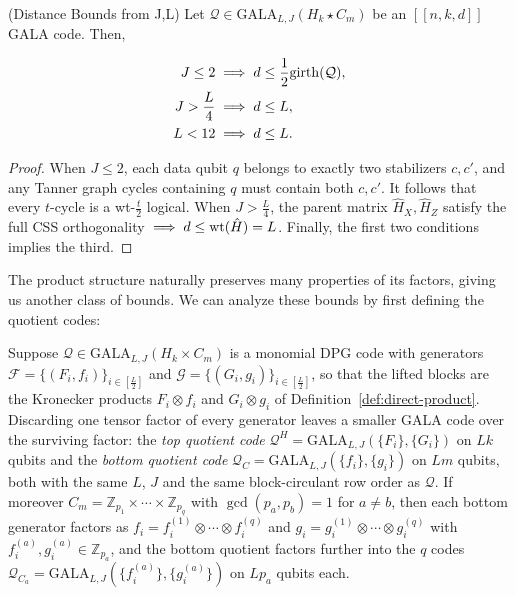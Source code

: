 \begin{proposition}(Distance Bounds from J,L)\label{prop:distance-bound}
Let $\mathcal{Q}\in \mathrm{GALA}_{L,J}(H_k\star C_m)$ be an $[[n,k,d]]$ GALA code. Then,

\begin{align}
     J\leq 2        &\implies d\leq \frac12\mathrm{girth}(\mathcal{Q})\label{eq:j<=2}, \\
     J>\frac{L}{4}  &\implies d\leq L,\label{eq:j>=L/4}\\
     L<12&\implies d\leq L.\label{eq:j<12}
\end{align}

\end{proposition}

\begin{proof}
    When $J\leq 2$, each data qubit $q$ belongs to exactly two stabilizers $c, c'$, and any Tanner graph cycles containing $q$ must contain both $c,c'$. It follows that every $t$-cycle is a wt-$\frac t2$ logical. When $J> \frac L4$, the parent matrix $\hat{H}_X, \hat{H}_Z$ satisfy the full CSS orthogonality $\implies d\leq \mathrm{wt}(\hat H) = L$. Finally, the first two conditions implies the third. 
\end{proof}


The product structure naturally preserves many properties of its factors, giving us another class of bounds. We can analyze these bounds by first defining the quotient codes:

\begin{definition}\label{def:quotient}
Suppose $\mathcal{Q}\in \mathrm{GALA}_{L,J}(H_k\times C_m)$ is a monomial DPG code with generators $\mathcal{F} = \{(F_i, f_i)\}_{i\in[\frac L2]}$ and $\mathcal{G} = \{(G_i,g_i)\}_{i\in [\frac L2]}$, so that the lifted blocks are the Kronecker products $F_i\otimes f_i$ and $G_i\otimes g_i$ of Definition~\ref{def:direct-product}. Discarding one tensor factor of every generator leaves a smaller GALA code over the surviving factor: the \emph{top quotient code} $\mathcal{Q}^H = \mathrm{GALA}_{L,J}(\{F_i\}, \{G_i\})$ on $Lk$ qubits and the \emph{bottom quotient code} $\mathcal{Q}_C = \mathrm{GALA}_{L,J}(\{f_i\}, \{g_i\})$ on $Lm$ qubits, both with the same $L$, $J$ and the same block-circulant row order as $\mathcal Q$. If moreover $C_m =\mathbb{Z}_{p_1}\times \cdots \times \mathbb{Z}_{p_q}$ with $\gcd(p_a, p_b) = 1$ for $a\neq b$, then each bottom generator factors as $f_i = f^{(1)}_i\otimes\cdots\otimes f^{(q)}_i$ and $g_i = g^{(1)}_i\otimes\cdots\otimes g^{(q)}_i$ with $f^{(a)}_i,g^{(a)}_i\in\mathbb Z_{p_a}$, and the bottom quotient factors further into the $q$ codes $\mathcal{Q}_{C_a} = \mathrm{GALA}_{L,J}(\{f^{(a)}_i\}, \{g^{(a)}_i\})$ on $Lp_a$ qubits each.
\end{definition}

